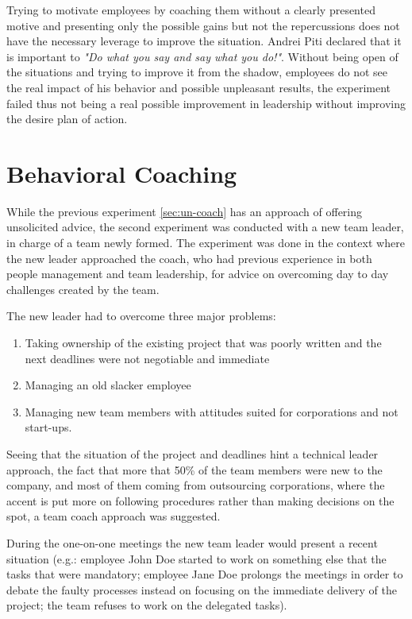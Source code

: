 Trying to motivate employees by coaching them without a clearly presented motive and presenting only the possible gains but not the repercussions does not have the necessary leverage to improve the situation. Andrei Piti declared that it is important to \textit{"Do what you say and say what you do!"}. Without being open of the situations and trying to improve it from the shadow, employees do not see the real impact of his behavior and possible unpleasant results, the experiment failed thus not being a real possible improvement in leadership without improving the desire plan of action.

\section{Behavioral Coaching}
\label{sec:beh-coach}

While the previous experiment \ref{sec:un-coach} has an approach of offering unsolicited advice, the second experiment was conducted with a new team leader, in charge of a team newly formed. The experiment was done in the context where the new leader approached the coach, who had previous experience in both people management and team leadership, for advice on overcoming day to day challenges created by the team. 

The new leader had to overcome three major problems:
\begin{enumerate}
\item Taking ownership of the existing project that was poorly written and the next deadlines were not negotiable and immediate
\item Managing an old slacker employee
\item Managing new team members with attitudes suited for corporations and not start-ups.
\end{enumerate}

Seeing that the situation of the project and deadlines hint a technical leader approach, the fact that more that 50\% of the team members were new to the company, and most of them coming from outsourcing corporations, where the accent is put more on following procedures rather than making decisions on the spot, a team coach approach was suggested.

During the one-on-one meetings the new team leader would present a recent situation (e.g.: employee John Doe started to work on something else that the tasks that were mandatory; employee Jane Doe prolongs the meetings in order to debate the faulty processes instead on focusing on the immediate delivery of the project; the team refuses to work on the delegated tasks).

